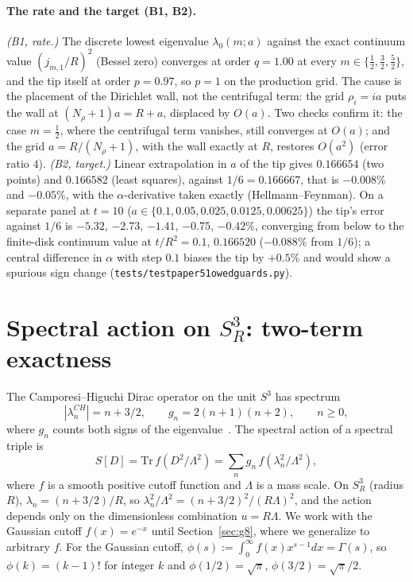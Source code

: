 \documentclass[11pt,a4paper]{article}
\theoremstyle{plain}
\theoremstyle{definition}
\newcommand{\sthree}{S^{3}}
\renewcommand{\_}{\textunderscore\allowbreak}
\begin{document}
\paragraph{The rate and the target (B1, B2).} \emph{(B1, rate.)} The
discrete lowest eigenvalue $\lambda_0(m;a)$ against the exact continuum value
$(j_{m,1}/R)^2$ (Bessel zero) converges at order $q=1.00$ at every
$m\in\{\tfrac12,\tfrac32,\tfrac52\}$, and the tip itself at order
$p=0.97$, so $p=1$ on the production grid. The cause is the placement of
the Dirichlet wall, not the centrifugal term: the grid $\rho_i=ia$ puts the
wall at $(N_\rho+1)a = R+a$, displaced by $O(a)$. Two checks confirm it: the
case $m=\tfrac12$, where the centrifugal term vanishes, still converges at
$O(a)$; and the grid $a=R/(N_\rho+1)$, with the wall exactly at $R$, restores
$O(a^2)$ (error ratio $4$). \emph{(B2, target.)} Linear extrapolation in $a$
of the tip gives $0.166654$ (two points) and $0.166582$ (least squares),
against $1/6 = 0.166667$, that is $-0.008\%$ and $-0.05\%$, with the
$\alpha$-derivative taken exactly (Hellmann--Feynman). On a separate panel at
$t = 10$ ($a\in\{0.1,0.05,0.025,0.0125,0.00625\}$) the tip's error against $1/6$ is
$-5.32$, $-2.73$, $-1.41$, $-0.75$, $-0.42\%$, converging from below to the
finite-disk continuum value at $t/R^2 = 0.1$, $0.166520$ ($-0.088\%$ from
$1/6$); a central difference in $\alpha$ with step $0.1$ biases the tip by
$+0.5\%$ and would show a spurious sign change
(\texttt{tests/test\_paper51\_owed\_guards.py}).

\section{Spectral action on $\sthree_R$: two-term exactness}
\label{sec:g1}

The Camporesi--Higuchi Dirac operator on the unit $\sthree$ has spectrum
\begin{equation}
  |\lambda_n^{CH}| = n + 3/2, \qquad g_n = 2(n+1)(n+2), \qquad n \ge 0,
  \label{eq:CH_spec}
\end{equation}
where $g_n$ counts both signs of the eigenvalue~\cite{camporesi_higuchi1996}.
The spectral action of a spectral triple is
\begin{equation}
  S[D] = \mathrm{Tr}\, f(D^2/\Lambda^2)
       = \sum_n g_n\, f(\lambda_n^2 / \Lambda^2),
\end{equation}
where $f$ is a smooth positive cutoff function and $\Lambda$ is a
mass scale. On $\sthree_R$ (radius $R$),
$\lambda_n = (n + 3/2)/R$, so $\lambda_n^2/\Lambda^2 = (n + 3/2)^2 /
(R\Lambda)^2$, and the action depends only on the dimensionless
combination $u = R \Lambda$. We work with the Gaussian cutoff
$f(x) = e^{-x}$ until Section~\ref{sec:g8}, where we generalize to
arbitrary $f$. For the Gaussian cutoff, $\phi(s) :=
\int_0^\infty f(x) x^{s-1} dx = \Gamma(s)$, so $\phi(k) = (k-1)!$ for
integer $k$ and $\phi(1/2) = \sqrt{\pi}$, $\phi(3/2) = \sqrt{\pi}/2$.
\end{document}
